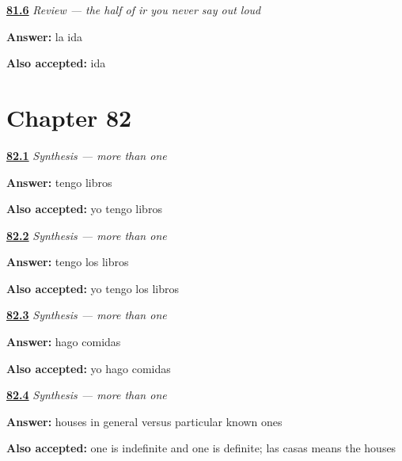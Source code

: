 \noindent\begin{minipage}[t]{\linewidth}
\raggedright
\hyperlink{review-ES-C44-repaso-ir-ida-build}{\textbf{81.6}} \emph{Review — the half of \emph{ir} you never say out loud}\par
\small \textbf{Answer:} la ida\par
\footnotesize \textbf{Also accepted:} ida
\end{minipage}\par\medskip

\section*{Chapter 82}

\noindent\begin{minipage}[t]{\linewidth}
\raggedright
\hyperlink{review-ES-C44-sintesis-mas-de-uno-bare}{\textbf{82.1}} \emph{Synthesis — more than one}\par
\small \textbf{Answer:} tengo libros\par
\footnotesize \textbf{Also accepted:} yo tengo libros
\end{minipage}\par\medskip

\noindent\begin{minipage}[t]{\linewidth}
\raggedright
\hyperlink{review-ES-C44-sintesis-mas-de-uno-definite}{\textbf{82.2}} \emph{Synthesis — more than one}\par
\small \textbf{Answer:} tengo los libros\par
\footnotesize \textbf{Also accepted:} yo tengo los libros
\end{minipage}\par\medskip

\noindent\begin{minipage}[t]{\linewidth}
\raggedright
\hyperlink{review-ES-C44-sintesis-mas-de-uno-meals}{\textbf{82.3}} \emph{Synthesis — more than one}\par
\small \textbf{Answer:} hago comidas\par
\footnotesize \textbf{Also accepted:} yo hago comidas
\end{minipage}\par\medskip

\noindent\begin{minipage}[t]{\linewidth}
\raggedright
\hyperlink{review-ES-C44-sintesis-mas-de-uno-contrast}{\textbf{82.4}} \emph{Synthesis — more than one}\par
\small \textbf{Answer:} houses in general versus particular known ones\par
\footnotesize \textbf{Also accepted:} one is indefinite and one is definite; las casas means the houses
\end{minipage}\par\medskip

